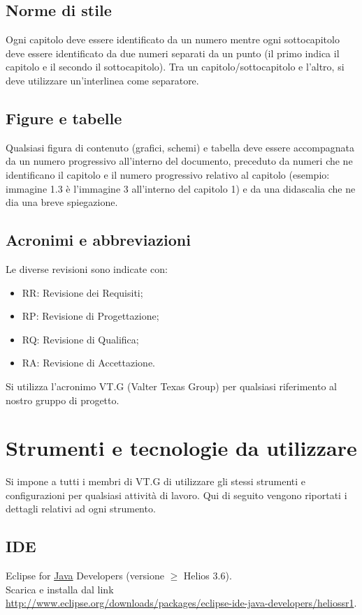 \section{Norme di stile}
Ogni capitolo deve essere identificato da un numero mentre ogni sottocapitolo
deve essere identificato da due numeri separati da un punto (il primo indica il
capitolo e il secondo il sottocapitolo). Tra un capitolo/sottocapitolo e
l'altro, si deve utilizzare un'interlinea come separatore.

\section{Figure e tabelle}
Qualsiasi figura di contenuto (grafici, schemi) e tabella deve essere
accompagnata da un numero progressivo all'interno del documento, preceduto da
numeri che ne identificano il capitolo e il numero progressivo relativo al capitolo (esempio: immagine 1.3
\`e l'immagine 3 all'interno del capitolo 1) e da una
didascalia che ne dia una breve spiegazione.

\section{Acronimi e abbreviazioni}
Le diverse revisioni sono indicate con:
\begin{itemize}
\item {RR: Revisione dei Requisiti;}
\item {RP: Revisione di Progettazione; }
\item {RQ: Revisione di Qualifica;}
\item {RA: Revisione di Accettazione.}
\end{itemize}
Si utilizza l'acronimo VT.G (Valter Texas Group) per qualsiasi riferimento al
nostro gruppo di progetto.



\chapter{Strumenti e tecnologie da utilizzare}
\thispagestyle{fancy}
Si impone a tutti i membri di VT.G di utilizzare gli stessi strumenti e
configurazioni per qualsiasi attivit\`a di lavoro. Qui di seguito vengono
riportati i dettagli relativi ad ogni strumento.

\section{IDE}
Eclipse for \underline{Java} Developers (versione $\geq$ Helios 3.6).
\\
Scarica e installa dal link\\
\url{http://www.eclipse.org/downloads/packages/eclipse-ide-java-developers/heliossr1}.
 
